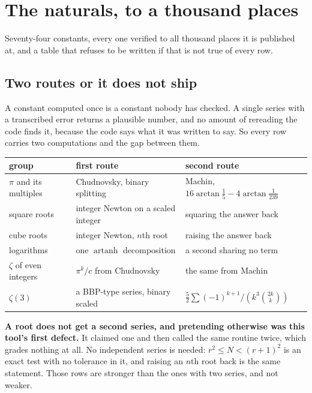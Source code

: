 %
%

\chapter{The naturals, to a thousand places}

Seventy-four constants, every one verified to all thousand places it is published at, and a table
that refuses to be written if that is not true of every row.

\section{Two routes or it does not ship}

A constant computed once is a constant nobody has checked. A single series with a transcribed error
returns a plausible number, and no amount of rereading the code finds it, because the code says what
it was written to say. So every row carries two computations and the gap between them.

\begin{center}
\begin{tabular}{@{}lll@{}}
\toprule
group & first route & second route \\
\midrule
\(\pi\) and its multiples & Chudnovsky, binary splitting & Machin, \(16\arctan\frac{1}{5}-4\arctan\frac{1}{239}\) \\
square roots & integer Newton on a scaled integer & squaring the answer back \\
cube roots & integer Newton, \(n\)th root & raising the answer back \\
logarithms & one \(\operatorname{artanh}\) decomposition & a second sharing no term \\
\(\zeta\) of even integers & \(\pi^k/c\) from Chudnovsky & the same from Machin \\
\(\zeta(3)\) & a BBP-type series, binary scaled & \(\frac{5}{2}\sum(-1)^{k+1}/(k^3\binom{2k}{k})\) \\
\bottomrule
\end{tabular}
\end{center}

\textbf{A root does not get a second series, and pretending otherwise was this tool's first defect.}
It claimed one and then called the same routine twice, which grades nothing at all. No independent
series is needed: \(r^2 \le N < (r+1)^2\) is an exact test with no tolerance in it, and raising an
\(n\)th root back is the same statement. Those rows are stronger than the ones with two series, and not
weaker.

